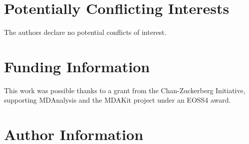\documentclass[9pt,whitepaper]{livecoms}
\newcommand{\githubrepository}{\url{https://github.com/MDAnalysis/MDAKits}}
\begin{document}

%



\section*{Potentially Conflicting Interests}

The authors declare no potential conflicts of interest.

\section*{Funding Information}

This work was possible thanks to a grant from the Chan-Zuckerberg Initiative, supporting MDAnalysis and the MDAKit project under an EOSS4 award.


\section*{Author Information}
\makeorcid




\end{document}
